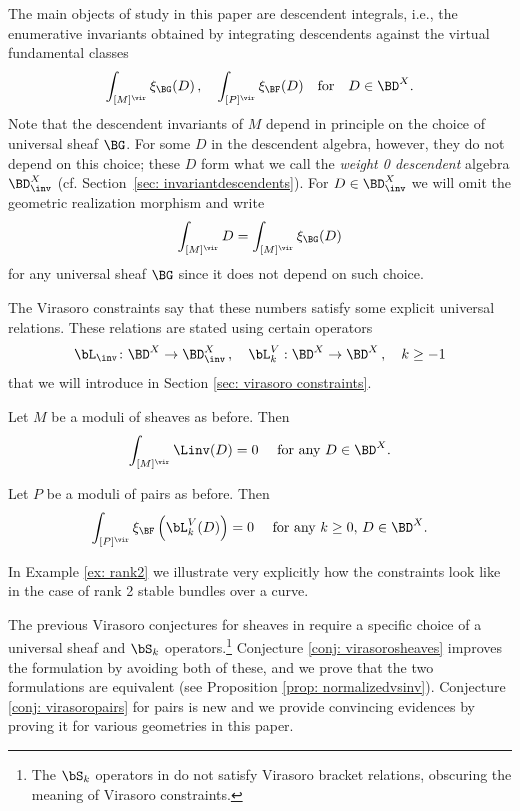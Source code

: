 The main objects of study in this paper are descendent integrals, i.e., the enumerative invariants obtained by integrating descendents against the virtual fundamental classes
\[\int_{[M]^\vir}\xi_{\BG}(D)\,,\quad \int_{[P]^\vir}\xi_{\BF}(D)\quad \textnormal{for}\quad D\in \BD^X.\]
Note that the descendent invariants of $M$ depend in principle on the choice of universal sheaf $\BG$. For some $D$ in the descendent algebra, however, they do not depend on this choice; these $D$ form what we call the  \textit{weight 0 descendent} algebra $\BD^X_{\inv}$ (cf. Section~\ref{sec: invariantdescendents}). For $D\in \BD^X_{\inv}$ we will omit the geometric realization morphism and write
\[\int_{[M]^\vir}D=\int_{[M]^\vir}\xi_\BG(D)\]
for any universal sheaf $\BG$ since it does not depend on such choice.

The Virasoro constraints say that these numbers satisfy some explicit universal relations. These relations are stated using certain operators
\[\bL_{\inv}\colon \BD^X\to \BD^X_{\inv}\,,\quad \bL_k^V:\BD^X\to \BD^X\,,\quad k\geq -1\]
that we will introduce in Section \ref{sec: virasoro constraints}.
\begin{conjecture}
\notready\label{conj: virasorosheaves}
Let $M$ be a moduli of sheaves as before. Then
\[\int_{[M]^\vir} \Linv(D)=0\quad \textup{ for any }D\in \BD^X.\]
\end{conjecture}

\begin{conjecture}
\notready
\label{conj: virasoropairs}
Let $P$ be a moduli of pairs as before. Then
\[\int_{[P]^\vir} \xi_\BF\left(\bL_k^V(D)\right)=0\quad \textup{ for any }k\geq 0, \, D\in \BD^X.\]
\end{conjecture}

In Example \ref{ex: rank2} we illustrate very explicitly how the constraints look like in the case of rank 2 stable bundles over a curve.

\begin{remark}
\notready
The previous Virasoro conjectures for sheaves in \cite{moop,moreira,bree} require a specific choice of a universal sheaf and $\bS_k$ operators.\footnote{The $\bS_k$ operators in \cite{moop,moreira,bree} do not satisfy Virasoro bracket relations, obscuring the meaning of Virasoro constraints.} Conjecture \ref{conj: virasorosheaves} improves the formulation by avoiding both of these, and  we prove that the two formulations are equivalent (see Proposition \ref{prop: normalizedvsinv}). Conjecture \ref{conj: virasoropairs} for pairs is new and we provide convincing evidences by proving it for various geometries in this paper.
\end{remark}

